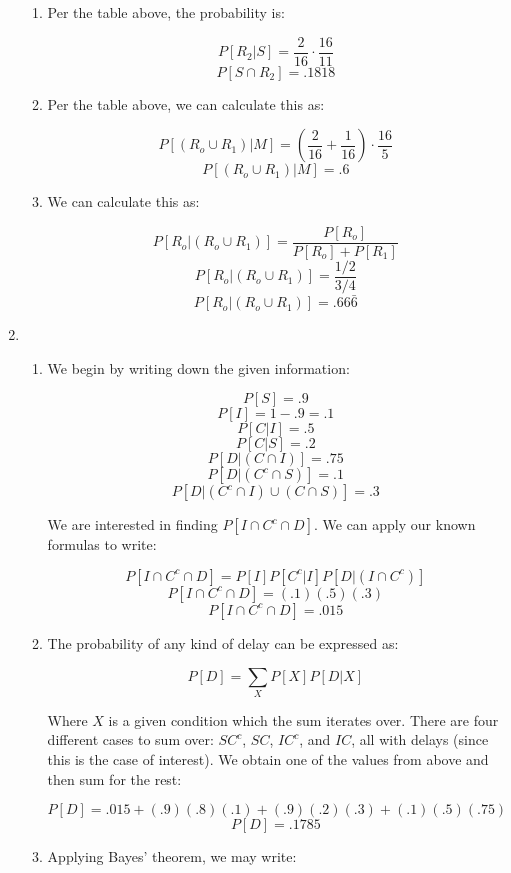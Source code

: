 \begin{enumerate}
\begin{enumerate}
      \item Per the table above, the probability is:

        $$P[R_2|S]=\frac{2}{16}\cdot\frac{16}{11}$$
        $$\boxed{P[S\cap R_2]=.1818}$$

      \item Per the table above, we can calculate this as:

        $$P[(R_o\cup R_1)|M]=\left(\frac{2}{16}+\frac{1}{16}\right)\cdot\frac{16}{5}$$
        $$\boxed{P[(R_o\cup R_1)|M]=.6}$$

      \item We can calculate this as:

        $$P[R_o|(R_o\cup R_1)]=\frac{P[R_o]}{P[R_o]+P[R_1]}$$
        $$P[R_o|(R_o\cup R_1)]=\frac{1/2}{3/4}$$
        $$\boxed{P[R_o|(R_o\cup R_1)]=.66\bar{6}}$$

    \end{enumerate}

  \item

    \begin{enumerate}

      \item We begin by writing down the given information:

        $$P[S]=.9$$
        $$P[I]=1-.9=.1$$
        $$P[C|I]=.5$$
        $$P[C|S]=.2$$
        $$P[D|(C\cap I)]=.75$$
        $$P[D|(C^c\cap S)]=.1$$
        $$P[D|(C^c\cap I)\cup (C\cap S)]=.3$$

        We are interested in finding $P[I\cap C^c\cap D]$. We can apply our known formulas to write:

        $$P[I\cap C^c\cap D]=P[I]P[C^c|I]P[D|(I\cap C^c)]$$
        $$P[I\cap C^c\cap D]=(.1)(.5)(.3)$$
        $$\boxed{P[I\cap C^c\cap D]=.015}$$

      \item The probability of any kind of delay can be expressed as:

        $$P[D]=\sum_{X} P[X]P[D|X]$$

        Where $X$ is a given condition which the sum iterates over. There are four different cases to sum over: $SC^c$, $SC$, $IC^c$, and $IC$, all with delays (since this is the case of interest). We obtain one of the values from above and then sum for the rest:

        $$P[D]=.015+(.9)(.8)(.1)+(.9)(.2)(.3)+(.1)(.5)(.75)$$
        $$\boxed{P[D]=.1785}$$

      \item Applying Bayes' theorem, we may write:


\end{enumerate}
\end{enumerate}

